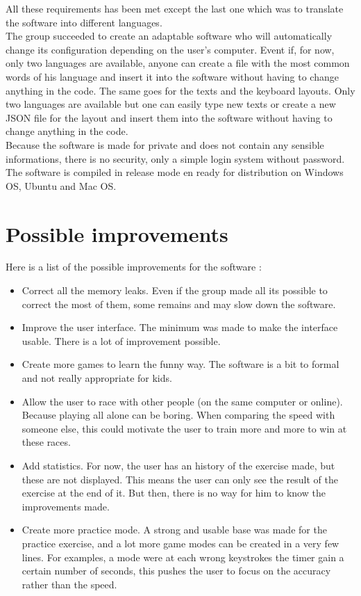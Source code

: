 All these requirements has been met except the last one which was to translate the software into different languages.\\
The group succeeded to create an adaptable software who will automatically change its configuration depending on the user's computer. Event if, for now, only two languages are available, anyone can create a file with the most common words of his language and insert it into the software without having to change anything in the code. The same goes for the texts and the keyboard layouts. Only two languages are available but one can easily type new texts or create a new JSON file for the layout and insert them into the software without having to change anything in the code.\\
Because the software is made for private and does not contain any sensible informations, there is no security, only a simple login system without password.\\
The software is compiled in release mode en ready for distribution on Windows OS, Ubuntu and Mac OS.


\chapter{Possible improvements}
Here is a list of the possible improvements for the software :
\begin{itemize}
	\item Correct all the memory leaks. Even if the group made all its possible to correct the most of them, some remains and may slow down the software.
	\item Improve the user interface. The minimum was made to make the interface usable. There is a lot of improvement possible.
	\item Create more games to learn the funny way. The software is a bit to formal and not really appropriate for kids.
	\item Allow the user to race with other people (on the same computer or online). Because playing all alone can be boring. When comparing the speed with someone else, this could motivate the user to train more and more to win at these races.
	\item Add statistics. For now, the user has an history of the exercise made, but these are not displayed. This means the user can only see the result of the exercise at the end of it. But then, there is no way for him to know the improvements made.
	\item Create more practice mode. A strong and usable base was made for the practice exercise, and a lot more game modes can be created in a very few lines. For examples, a mode were at each wrong keystrokes the timer gain a certain number of seconds, this pushes the user to focus on the accuracy rather than the speed.
\end{itemize}


